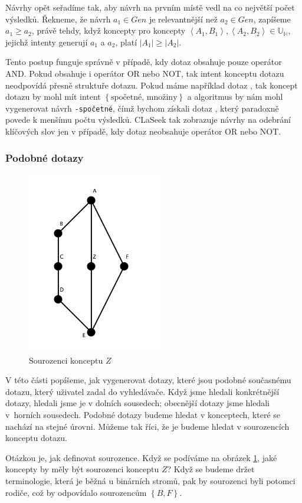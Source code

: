 \documentclass{article}
\newcommand{\name}{CLaSeek}
\newcommand{\code}[1]{\texttt{#1}}
\newcommand{\sssection}[1]{\subsubsection{#1}}
\newcommand{\adds}[1]{\left\{#1\right\}}
\newcommand{\addsp}[1]{\left<#1\right>}
\newcommand{\hledany}{\mathbb{H}}
\newcommand{\upperc}{\mathbb{U}}
\begin{document}
Návrhy opět seřadíme tak, aby návrh na prvním místě vedl na co největší počet výsledků. Řekneme, že návrh $a_1\in Gen$ je relevantnější než $a_2\in Gen$, zapíšeme $a_1\ge a_2$, právě tehdy, když koncepty pro koncepty $\addsp{A_1, B_1}, \addsp{A_2, B_2} \in \upperc_\hledany$, jejichž intenty generují $a_1$ a $a_2$, platí $|A_1|\ge|A_2|$. 

Tento postup funguje správně v případě, kdy dotaz obsahuje pouze operátor AND. Pokud obsahuje i operátor OR nebo NOT, tak intent konceptu dotazu neodpovídá přesně struktuře dotazu. Pokud máme například dotaz , tak koncept dotazu by mohl mít intent $\adds{\mbox{spočetné, množiny}}$ a algoritmus by nám mohl vygenerovat návrh \code{-spočetné}, čímž bychom získali dotaz , který paradoxně povede k menšímu počtu výsledků. \name{} tak zobrazuje návrhy na odebrání klíčových slov jen v případě, kdy dotaz neobsahuje operátor OR nebo NOT. 

\sssection{Podobné dotazy}
\begin{figure}
  \centering
  \includegraphics[width=6cm]{obrazky/siblings.pdf}
  \caption{Sourozenci konceptu $Z$}
  \label{fig.siblings}
\end{figure}

V této části popíšeme, jak vygenerovat dotazy, které jsou podobné současnému dotazu, který uživatel zadal do vyhledávače. Když jsme hledali konkrétnější dotazy, hledali jsme je v dolních sousedech; obecnější dotazy jsme hledali v~horních sousedech. Podobné dotazy budeme hledat v konceptech, které se nachází na stejné úrovni. Můžeme tak říci, že je budeme hledat v sourozencích konceptu dotazu. 

Otázkou je, jak definovat sourozence. Když se podíváme na obrázek \ref{fig.siblings}, jaké koncepty by měly být sourozenci konceptu $Z$? Když se budeme držet terminologie, která je běžná u binárních stromů, pak by sourozenci byli potomci rodiče, což by odpovídalo sourozencům $\adds{B, F}$. 
\end{document}
